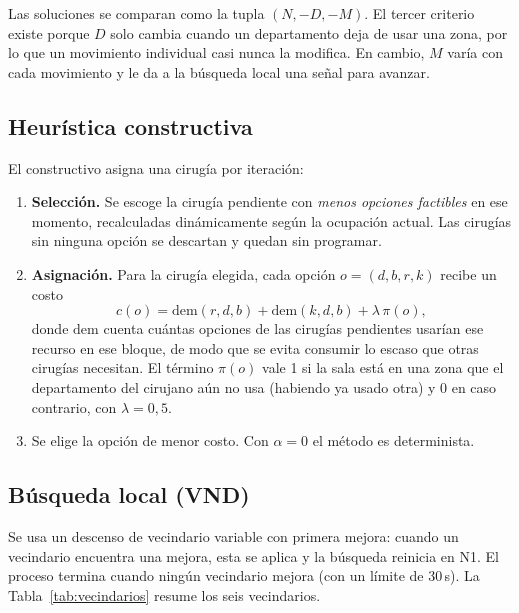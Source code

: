 Las soluciones se comparan como la tupla $(N,-D,-M)$. El tercer criterio existe porque $D$ solo cambia cuando un departamento deja de usar una zona, por lo que un movimiento individual casi nunca la modifica. En cambio, $M$ varía con cada movimiento y le da a la búsqueda local una señal para avanzar.

\subsection{Heurística constructiva}

El constructivo asigna una cirugía por iteración:

\begin{enumerate}
	\item \textbf{Selección.} Se escoge la cirugía pendiente con \emph{menos opciones factibles} en ese momento, recalculadas dinámicamente según la ocupación actual. Las cirugías sin ninguna opción se descartan y quedan sin programar.
	\item \textbf{Asignación.} Para la cirugía elegida, cada opción $o=(d,b,r,k)$ recibe un costo
	\begin{equation}
		c(o)=\mathrm{dem}(r,d,b)+\mathrm{dem}(k,d,b)+\lambda\,\pi(o),
		\label{eq:costo}
	\end{equation}
	donde $\mathrm{dem}$ cuenta cuántas opciones de las cirugías pendientes usarían ese recurso en ese bloque, de modo que se evita consumir lo escaso que otras cirugías necesitan. El término $\pi(o)$ vale 1 si la sala está en una zona que el departamento del cirujano aún no usa (habiendo ya usado otra) y 0 en caso contrario, con $\lambda=0{,}5$.
	\item Se elige la opción de menor costo. Con $\alpha=0$ el método es determinista.
\end{enumerate}

\subsection{Búsqueda local (VND)}

Se usa un descenso de vecindario variable con primera mejora: cuando un vecindario encuentra una mejora, esta se aplica y la búsqueda reinicia en N1. El proceso termina cuando ningún vecindario mejora (con un límite de 30\,s). La Tabla~\ref{tab:vecindarios} resume los seis vecindarios.

